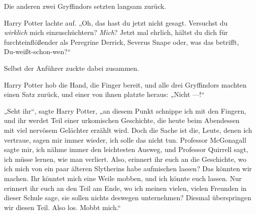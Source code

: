 Die anderen zwei Gryffindors setzten langsam zurück.

Harry Potter lachte auf.
„Oh, das hast du jetzt nicht gesagt. Versuchst du \emph{wirklich} mich einzuschüchtern? \emph{Mich}? Jetzt mal ehrlich, hältst du dich für furchteinflößender als Peregrine Derrick, Severus Snape oder, was das betrifft, Du-weißt-schon-wen?“

Selbst der Anführer zuckte dabei zusammen.

Harry Potter hob die Hand, die Finger bereit, und alle drei Gryffindors machten einen Satz zurück, und einer von ihnen platzte heraus:
„Nicht —!“

„Seht ihr“, sagte Harry Potter, „an diesem Punkt schnippe ich mit den Fingern, und ihr werdet Teil einer urkomischen Geschichte, die heute beim Abendessen mit viel nervösem Gelächter erzählt wird. Doch die Sache ist die, Leute, denen ich vertraue, sagen mir immer wieder, ich solle das nicht tun. Professor McGonagall sagte mir, ich nähme immer den leichtesten Ausweg, und Professor Quirrell sagt, ich müsse lernen, wie man verliert. Also, erinnert ihr euch an die Geschichte, wo ich mich von ein paar älteren Slytherins habe aufmischen lassen? Das könnten wir machen. Ihr könntet mich eine Weile mobben, und ich könnte euch lassen. Nur erinnert ihr euch an den Teil am Ende, wo ich meinen vielen, vielen Freunden in dieser Schule sage, sie sollen nichts deswegen unternehmen? Diesmal überspringen wir diesen Teil. Also los. Mobbt mich.“

